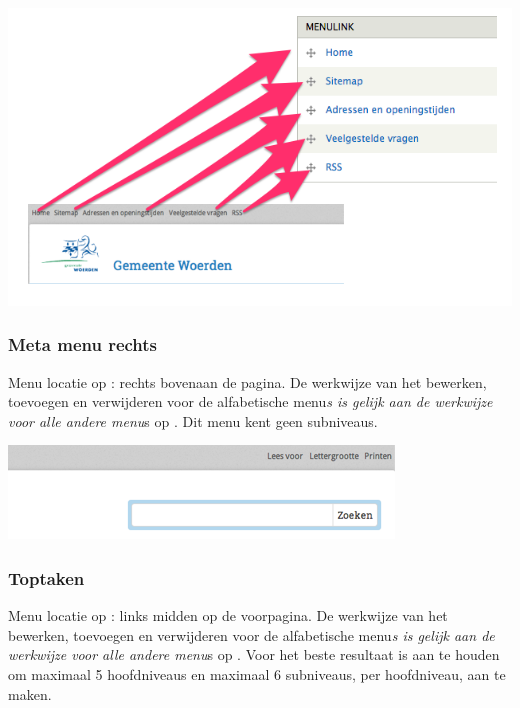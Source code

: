 \begin{center}
	\includegraphics[width=\textwidth]{img/meta-menu.png}
\end{center}

\bigskip

\subsubsection{Meta menu rechts}\label{metamenurechts}
Menu locatie op \drupalpath{}: rechts bovenaan de pagina. De werkwijze van het bewerken, toevoegen en verwijderen voor de alfabetische menu\emph{s is gelijk aan de werkwijze voor alle andere menu}s op \drupalpath{}. Dit menu kent geen subniveaus.
\bigskip

\begin{center}
	\includegraphics[width=\textwidth]{img/menu_metarechts.png}
\end{center}

\bigskip

\subsubsection{Toptaken}\label{toptaken}
Menu locatie op \drupalpath{}: links midden op de voorpagina. De werkwijze van het bewerken, toevoegen en verwijderen voor de alfabetische menu\emph{s is gelijk aan de werkwijze voor alle andere menu}s op \drupalpath{}. Voor het beste resultaat is aan te houden om maximaal 5 hoofdniveaus en maximaal 6 subniveaus, per hoofdniveau, aan te maken.

